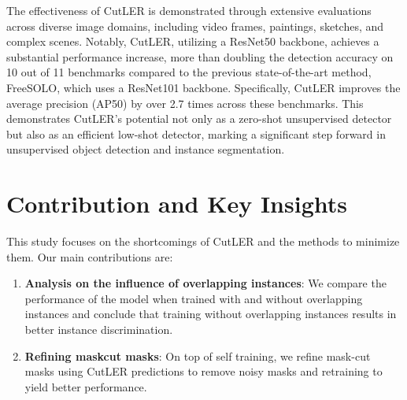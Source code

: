 The effectiveness of CutLER is demonstrated through extensive evaluations across diverse image domains, including video frames, paintings, sketches, and complex scenes. Notably, CutLER, utilizing a ResNet50 backbone, achieves a substantial performance increase, more than doubling the detection accuracy on 10 out of 11 benchmarks compared to the previous state-of-the-art method, FreeSOLO, which uses a ResNet101 backbone. Specifically, CutLER improves the average precision (AP50) by over 2.7 times across these benchmarks. This demonstrates CutLER's potential not only as a zero-shot unsupervised detector but also as an efficient low-shot detector, marking a significant step forward in unsupervised object detection and instance segmentation.

\section{Contribution and Key Insights}

This study focuses on the shortcomings of CutLER and the methods to minimize them. Our main contributions are:

\begin{enumerate}
    
    \item \textbf{Analysis on the influence of overlapping instances}: We compare the performance of the model when trained with and without overlapping instances and conclude that training without overlapping instances results in better instance discrimination.

    \item \textbf{Refining maskcut masks}: On top of self training, we refine mask-cut masks using CutLER predictions to remove noisy masks and retraining to yield better performance.
\end{enumerate}


